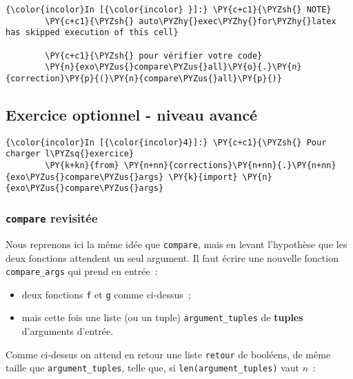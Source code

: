     \begin{Verbatim}[commandchars=\\\{\},frame=single,framerule=0.3mm,rulecolor=\color{cellframecolor}]
{\color{incolor}In [{\color{incolor} }]:} \PY{c+c1}{\PYZsh{} NOTE}
        \PY{c+c1}{\PYZsh{} auto\PYZhy{}exec\PYZhy{}for\PYZhy{}latex has skipped execution of this cell}
        
        \PY{c+c1}{\PYZsh{} pour vérifier votre code}
        \PY{n}{exo\PYZus{}compare\PYZus{}all}\PY{o}{.}\PY{n}{correction}\PY{p}{(}\PY{n}{compare\PYZus{}all}\PY{p}{)}
\end{Verbatim}


    \hypertarget{exercice-optionnel---niveau-avancuxe9}{%
\subsection{Exercice optionnel - niveau
avancé}\label{exercice-optionnel---niveau-avancuxe9}}

    \begin{Verbatim}[commandchars=\\\{\},frame=single,framerule=0.3mm,rulecolor=\color{cellframecolor}]
{\color{incolor}In [{\color{incolor}4}]:} \PY{c+c1}{\PYZsh{} Pour charger l\PYZsq{}exercice}
        \PY{k+kn}{from} \PY{n+nn}{corrections}\PY{n+nn}{.}\PY{n+nn}{exo\PYZus{}compare\PYZus{}args} \PY{k}{import} \PY{n}{exo\PYZus{}compare\PYZus{}args}
\end{Verbatim}


    \hypertarget{compare-revisituxe9e}{%
\subsubsection{\texorpdfstring{\texttt{compare}
revisitée}{compare revisitée}}\label{compare-revisituxe9e}}

    Nous reprenons ici la même idée que \texttt{compare}, mais en levant
l'hypothèse que les deux fonctions attendent un seul argument. Il faut
écrire une nouvelle fonction \texttt{compare\_args} qui prend en
entrée~:

\begin{itemize}
\tightlist
\item
  deux fonctions \texttt{f} et \texttt{g} comme ci-dessus~;
\item
  mais cette fois une liste (ou un tuple) \texttt{argument\_tuples} de
  \textbf{tuples} d'arguments d'entrée.
\end{itemize}

Comme ci-dessus on attend en retour une liste \texttt{retour} de
booléens, de même taille que \texttt{argument\_tuples}, telle que, si
\texttt{len(argument\_tuples)} vaut \(n\)~:

